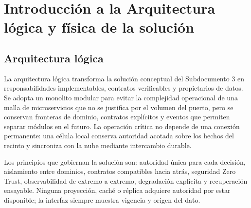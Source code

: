 \documentclass[11pt,letterpaper]{report}
\begin{document}
\tableofcontents
\clearpage
\setcounter{chapter}{3}
\chapter{Introducción a la Arquitectura lógica y física de la solución}

\section{Arquitectura lógica}

La arquitectura lógica transforma la solución conceptual del Subdocumento 3 en responsabilidades implementables, contratos verificables y propietarios de datos. Se adopta un monolito modular para evitar la complejidad operacional de una malla de microservicios que no se justifica por el volumen del puerto, pero se conservan fronteras de dominio, contratos explícitos y eventos que permiten separar módulos en el futuro. La operación crítica no depende de una conexión permanente: una célula local conserva autoridad acotada sobre los hechos del recinto y sincroniza con la nube mediante intercambio durable.

Los principios que gobiernan la solución son: autoridad única para cada decisión, aislamiento entre dominios, contratos compatibles hacia atrás, seguridad Zero Trust, observabilidad de extremo a extremo, degradación explícita y recuperación ensayable. Ninguna proyección, caché o réplica adquiere autoridad por estar disponible; la interfaz siempre muestra vigencia y origen del dato.
\end{document}
